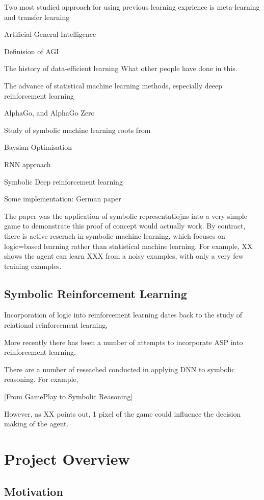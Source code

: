 \documentclass[12pt,twoside]{report}
\begin{document}
Two most studied approach for using previous learning exprience is meta-learning and transfer learning

Artificial General Intelligence

Definision of AGI

The history of data-efficient learning
What other people have done in this.

The advance of statistical machine learning methods, especially deeep reinforcement learning

AlphaGo, and AlphaGo Zero

Study of symbolic machine learning roots from

Baysian Optimisation

RNN approach

Symbolic Deep reinforcement learning

Some implementation: German paper

The paper was the application of symbolic representatiojns into a very simple game to demonstrate this proof of concept would actually work.
By contract, there is active reserach in symbolic machine learning, which focuses on logic=based learning rather than statistical machine learning.
For example, XX shows the agent can learn XXX from a noisy examples, with only a very few training examples.


\section{Symbolic Reinforcement Learning}
Incorporation of logic into reinforcement learning dates back to the study of relational reinforcement learning,


More recently there has been a number of attempts to incorporate ASP into reinforcement learning.

There are a number of reseached conducted in applying DNN to symbolic reasoning.
For example,

[From GamePlay to Symbolic Reasoning]


However, as XX points out, 1 pixel of the game could influence the decision making of the agent.


\chapter{Project Overview}
\section{Motivation}
\end{document}
